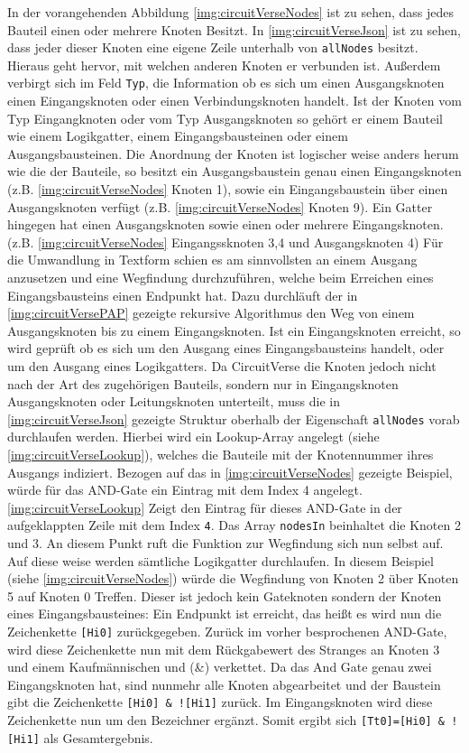  
 In der vorangehenden Abbildung \ref{img:circuitVerseNodes} ist zu sehen, dass jedes Bauteil einen oder mehrere Knoten Besitzt. In \autoref{img:circuitVerseJson} ist zu sehen, dass jeder dieser Knoten eine eigene Zeile unterhalb von \texttt{allNodes} besitzt. Hieraus geht hervor, mit welchen anderen Knoten er verbunden ist. Außerdem verbirgt sich im Feld \texttt{Typ}, die Information ob es sich um einen Ausgangsknoten einen Eingangsknoten oder einen Verbindungsknoten handelt. Ist der Knoten vom Typ Eingangknoten oder vom Typ Ausgangsknoten so gehört er einem Bauteil wie einem Logikgatter, einem Eingangsbausteinen oder einem Ausgangsbausteinen. Die Anordnung der Knoten ist logischer weise anders herum wie die der Bauteile, so besitzt ein Ausgangsbaustein genau einen Eingangsknoten (z.B.  \ref{img:circuitVerseNodes} Knoten 1), sowie ein Eingangsbaustein über einen Ausgangsknoten verfügt (z.B. \autoref{img:circuitVerseNodes} Knoten 9). Ein Gatter hingegen hat einen Ausgangsknoten sowie einen oder mehrere Eingangsknoten. (z.B. \autoref{img:circuitVerseNodes} Eingangssknoten 3,4 und Ausgangsknoten 4) Für die Umwandlung in Textform schien es am sinnvollsten an einem Ausgang anzusetzen und eine Wegfindung durchzuführen, welche beim Erreichen eines Eingangsbausteins einen Endpunkt hat. Dazu durchläuft der in \autoref{img:circuitVersePAP} gezeigte rekursive Algorithmus den Weg von einem Ausgangsknoten bis zu einem Eingangsknoten. Ist ein Eingangsknoten erreicht, so wird geprüft ob es sich um den Ausgang eines Eingangsbausteins handelt, oder um den Ausgang eines Logikgatters. Da CircuitVerse die Knoten jedoch nicht nach der Art des zugehörigen Bauteils, sondern nur in Eingangsknoten Ausgangsknoten oder Leitungsknoten unterteilt, muss die in \ref{img:circuitVerseJson} gezeigte Struktur oberhalb der Eigenschaft \texttt{allNodes} vorab durchlaufen werden. Hierbei wird ein Lookup-Array angelegt (siehe \autoref{img:circuitVerseLookup}), welches die Bauteile mit der Knotennummer ihres Ausgangs indiziert. Bezogen auf das in \autoref{img:circuitVerseNodes} gezeigte Beispiel, würde für das AND-Gate ein Eintrag mit dem Index 4 angelegt. \autoref{img:circuitVerseLookup} Zeigt den Eintrag für dieses AND-Gate in der aufgeklappten Zeile mit dem Index \texttt{4}. Das Array \texttt{nodesIn} beinhaltet die Knoten 2 und 3. An diesem Punkt ruft die Funktion zur Wegfindung sich nun selbst auf. Auf diese weise werden sämtliche Logikgatter durchlaufen. In diesem Beispiel (siehe \autoref{img:circuitVerseNodes}) würde die Wegfindung von Knoten 2 über Knoten 5 auf Knoten 0 Treffen. Dieser ist jedoch kein Gateknoten sondern der Knoten eines Eingangsbausteines: Ein Endpunkt ist erreicht, das heißt es wird nun die Zeichenkette \texttt{[Hi0]} zurückgegeben. Zurück im vorher besprochenen AND-Gate, wird diese Zeichenkette nun mit dem Rückgabewert des Stranges an Knoten 3 und einem Kaufmännischen und (\&) verkettet. Da das And Gate genau zwei Eingangsknoten hat, sind nunmehr alle Knoten abgearbeitet und der Baustein gibt die Zeichenkette \texttt{[Hi0] \& ![Hi1]} zurück. Im Eingangsknoten wird diese Zeichenkette nun um den Bezeichner ergänzt.  Somit ergibt sich \texttt{[Tt0]=[Hi0] \& ![Hi1]} als Gesamtergebnis. 
